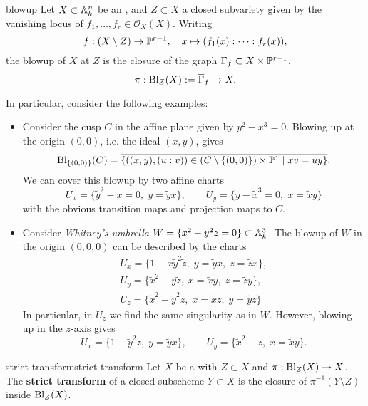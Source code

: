 \begin{example}{blowup}
    Let $X \subset \AA^n_k$ be an , and $Z \subset X$ a closed subvariety given by the vanishing locus of $f_1, \ldots, f_r \in \mathcal{O}_X(X)$. Writing
    \[ f : (X \setminus Z) \to \PP^{r - 1}, \quad x \mapsto (f_1(x) : \cdots : f_r(x)) , \]
    the blowup of $X$ at $Z$ is the closure of the graph $\Gamma_f \subset X \times \PP^{r - 1}$,
    \[ \pi : \textup{Bl}_Z(X) := \overline{\Gamma}_f \to X . \]

    In particular, consider the following examples:
    \begin{itemize}
        \item Consider the cusp $C$ in the affine plane given by $y^2 - x^3 = 0$. Blowing up at the origin $(0, 0)$, i.e. the ideal $(x, y)$, gives
        \[ \textup{Bl}_{\{ (0, 0) \}}(C) = \overline{\{ ((x, y), (u : v)) \in (C \setminus \{ (0, 0) \}) \times \PP^1 \mid xv = uy \}} . \]
        We can cover this blowup by two affine charts
        \[ U_x = \{ \tilde{y}^2 - x = 0, \; y = \tilde{y} x \}, \qquad U_y = \{ y - \tilde{x}^3 = 0, \; x = \tilde{x} y \} \]
        with the obvious transition maps and projection maps to $C$.
        
        \item Consider \textit{Whitney's umbrella} $W = \{ x^2 - y^2 z = 0 \} \subset \AA^3_k$. The blowup of $W$ in the origin $(0, 0, 0)$ can be described by the charts
        \[ \begin{aligned}
            U_x = \{ 1 - x \tilde{y}^2 \tilde{z}, \; y = \tilde{y} x, \; z = \tilde{z} x \} , \\
            U_y = \{ \tilde{x}^2 - y \tilde{z}, \; x = \tilde{x} y, \; z = \tilde{z} y \} , \\
            U_z = \{ \tilde{x}^2 - \tilde{y}^2 z, \; x = \tilde{x} z, \; y = \tilde{y} z \}
        \end{aligned} \]
        In particular, in $U_z$ we find the same singularity as in $W$. However, blowing up in the $z$-axis gives
        \[ U_x = \{ 1 - \tilde{y}^2 z, \; y = \tilde{y} x \}, \qquad U_y = \{ \tilde{x}^2 - z, \; x = \tilde{x} y \} . \]
    \end{itemize}
\end{example}

\begin{topic}{strict-transform}{strict transform}
    Let $X$ be a  with  $Z \subset X$ and  $\pi : \textup{Bl}_Z(X) \to X$. The \textbf{strict transform} of a closed subscheme $Y \subset X$ is the closure of $\pi^{-1}(Y \setminus Z)$ inside $\textup{Bl}_Z(X)$.
\end{topic}

